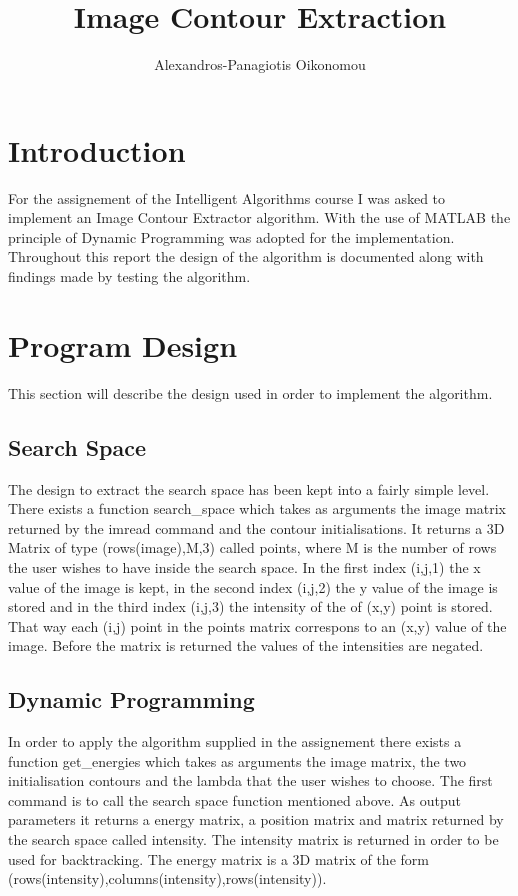 \documentclass[12pt,a4paper,twocolumn]{article}
\author{Alexandros-Panagiotis Oikonomou}
\title{Image Contour Extraction}
\begin{document}
\maketitle
\newpage
\thispagestyle{empty}
\mbox{}
\newpage
\thispagestyle{empty}
\mbox{}
\newpage
\thispagestyle{empty}
\mbox{}
\section{Introduction}
For the assignement of the Intelligent Algorithms course I was asked to implement an Image Contour Extractor algorithm. With the use of MATLAB the principle of Dynamic Programming was adopted for the implementation. Throughout this report the design of the algorithm is documented along with findings made by testing the algorithm. 
\section{Program Design}
This section will describe the design used in order to implement the algorithm.
\subsection{Search Space}
The design to extract the search space has been kept into a fairly simple level. There exists a function search\_space which takes as arguments the image matrix returned by the imread command and the contour initialisations. It returns a 3D Matrix of type (rows(image),M,3) called points, where M is the number of rows the user wishes to have inside the search space. In the first index (i,j,1) the x value of the image is kept, in the second index (i,j,2) the y value of the image is stored and in the third index (i,j,3) the intensity of the of (x,y) point is stored. That way each (i,j) point in the points matrix correspons to an (x,y) value of the image. Before the matrix is returned the values of the intensities are negated.
\subsection{Dynamic Programming}
In order to apply the algorithm supplied in the assignement there exists a function get\_energies which takes as arguments the image matrix, the two initialisation contours and the lambda that the user wishes to choose. The first command is to call the search space function mentioned above. As output parameters it returns a energy matrix, a position matrix and matrix returned by the search space called intensity. The intensity matrix is returned in order to be used for backtracking. The energy matrix is a 3D matrix of the form (rows(intensity),columns(intensity),rows(intensity)). 
\end{document}
